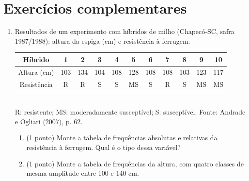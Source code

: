 \documentclass[11pt]{article}
\begin{document}
\bigskip
\section*{Exercícios complementares}

\begin{enumerate}[label=\textbf{C\arabic*.}, leftmargin=*]
\item Resultados de um experimento com híbridos de milho (Chapecó-SC, safra 1987/1988): altura da espiga (cm) e resistência à ferrugem.
\begin{center}\small
\begin{tabular}{c|cccccccccc}
\toprule
Híbrido & 1 & 2 & 3 & 4 & 5 & 6 & 7 & 8 & 9 & 10 \\
\midrule
Altura (cm) & 103 & 134 & 104 & 108 & 128 & 108 & 108 & 103 & 123 & 117 \\
Resistência & R & R & S & S & MS & S & R & S & MS & MS \\
\bottomrule
\end{tabular}\\[0.3em]
{\footnotesize R: resistente; MS: moderadamente susceptível; S: susceptível. Fonte: Andrade e Ogliari (2007), p. 62.}
\end{center}
\begin{enumerate}[label=(\alph*)]
  \item (1 ponto) Monte a tabela de frequências absolutas e relativas da resistência à ferrugem. Qual é o tipo dessa variável?
  \item (1 ponto) Monte a tabela de frequências da altura, com quatro classes de mesma amplitude entre 100 e 140 cm.
\end{enumerate}

\end{enumerate}
\end{document}

